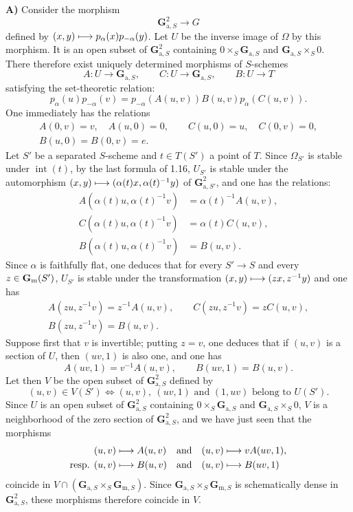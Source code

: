 \textbf{A)} Consider the morphism
\[
\mathbf G_{\mathrm a,S}^2\to G
\]
defined by $(x,y)\longmapsto p_\alpha(x)p_{-\alpha}(y)$. Let $U$ be the inverse image of $\Omega$ by this morphism. It is an open subset of $\mathbf G_{\mathrm a,S}^2$ containing $0\times_S\mathbf G_{\mathrm a,S}$ and $\mathbf G_{\mathrm a,S}\times_S0$. There therefore exist uniquely determined morphisms of $S$-schemes
\[
A:U\to\mathbf G_{\mathrm a,S},\qquad C:U\to\mathbf G_{\mathrm a,S},\qquad B:U\to T
\]
satisfying the set-theoretic relation:
\[
p_\alpha(u)p_{-\alpha}(v)=p_{-\alpha}(A(u,v))B(u,v)p_\alpha(C(u,v)).
\]
One immediately has the relations
\[
\begin{gathered}
A(0,v)=v,\quad A(u,0)=0,\qquad C(u,0)=u,\quad C(0,v)=0,\\
B(u,0)=B(0,v)=e.
\end{gathered}
\]
Let $S'$ be a separated $S$-scheme and $t\in T(S')$ a point of $T$. Since $\Omega_{S'}$ is stable under $\operatorname{int}(t)$, by the last formula of 1.16, $U_{S'}$ is stable under the automorphism $(x,y)\longmapsto(\alpha(t)x,\alpha(t)^{-1}y)$ of $\mathbf G_{\mathrm a,S'}^2$, and one has the relations:
\[
\begin{aligned}
A(\alpha(t)u,\alpha(t)^{-1}v)&=\alpha(t)^{-1}A(u,v),\\
C(\alpha(t)u,\alpha(t)^{-1}v)&=\alpha(t)C(u,v),\\
B(\alpha(t)u,\alpha(t)^{-1}v)&=B(u,v).
\end{aligned}
\]
Since $\alpha$ is faithfully flat, one deduces that for every $S'\to S$ and every $z\in\mathbf{G}_{\mathrm{m}}(S')$, $U_{S'}$ is stable under the transformation $(x,y)\longmapsto(zx,z^{-1}y)$ and one has
\[
\begin{gathered}
A(zu,z^{-1}v)=z^{-1}A(u,v),\qquad C(zu,z^{-1}v)=zC(u,v),\\
B(zu,z^{-1}v)=B(u,v).
\end{gathered}
\]
Suppose first that $v$ is invertible; putting $z=v$, one deduces that if $(u,v)$ is a section of $U$, then $(uv,1)$ is also one, and one has
\[
A(uv,1)=v^{-1}A(u,v),\qquad B(uv,1)=B(u,v).
\]
Let then $V$ be the open subset of $\mathbf G_{\mathrm a,S}^2$ defined by{\renewcommand{\thefootnote}{(10)}}
\[
(u,v)\in V(S')\Longleftrightarrow(u,v),\ (uv,1)\text{ and }(1,uv)\text{ belong to }U(S').
\]
Since $U$ is an open subset of $\mathbf G_{\mathrm a,S}^2$ containing $0\times_S\mathbf G_{\mathrm a,S}$ and $\mathbf G_{\mathrm a,S}\times_S0$, $V$ is a neighborhood of the zero section of $\mathbf G_{\mathrm a,S}^2$, and we have just seen that the morphisms
\[
\begin{aligned}
(u,v)&\longmapsto A(u,v)&\text{and}\quad(u,v)&\longmapsto vA(uv,1),\\
\text{resp. }(u,v)&\longmapsto B(u,v)&\text{and}\quad(u,v)&\longmapsto B(uv,1)
\end{aligned}
\]
coincide in $V\cap(\mathbf G_{\mathrm a,S}\times_S\mathbf G_{\mathrm m,S})$. Since $\mathbf G_{\mathrm a,S}\times_S\mathbf G_{\mathrm m,S}$ is schematically dense in $\mathbf G_{\mathrm a,S}^2$, these morphisms therefore coincide in $V$.

